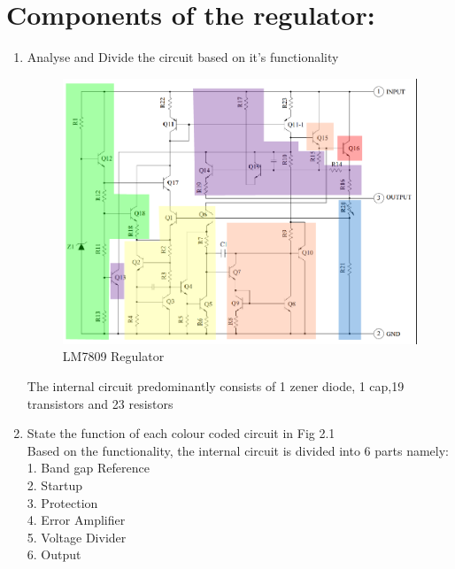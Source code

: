 \documentclass[journal,12pt,twocolumn]{IEEEtran}
\renewcommand\thesection{\arabic{section}}
\begin{document}
\section{ Components of the regulator:}
\begin{enumerate}[label=\thesection.\arabic*,ref=\thesection.\theenumi]
\item Analyse and Divide the circuit based on it's functionality\\
\solution
\begin{figure}[!ht]
\centering	
\includegraphics[width=\columnwidth]{./figs/Colorfig.eps}
\caption{LM7809 Regulator}
\label{fig:2}
\end{figure}
The internal circuit predominantly consists of 1 zener diode, 1 cap,19 transistors and 23 resistors

\item State the function of each colour coded circuit in Fig 2.1\\
\solution
Based on the functionality, the internal circuit is divided into 6 parts namely: \\
 1. Band gap Reference \\
 2. Startup\\
 3. Protection \\
 4. Error Amplifier\\
 5. Voltage Divider \\
 6. Output
\end{enumerate}
\end{document}
